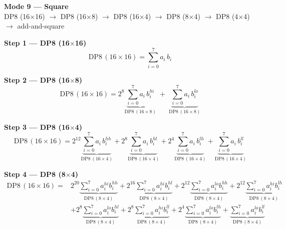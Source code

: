 \documentclass[fleqn]{article}
\newcommand{\DPop}[3]{\mathrm{DP#1}\,(#2\!\times\!#3)}
\begin{document}
\begin{center}
{\LARGE \textbf{Mode 9 --- Square}}\\[4pt]
{\large DP8 (16$\times$16) $\rightarrow$ DP8 (16$\times$8) $\rightarrow$ DP8 (16$\times$4) $\rightarrow$ DP8 (8$\times$4) $\rightarrow$ DP8 (4$\times$4) $\rightarrow$ add-and-square}
\end{center}

\vspace{0.1em}

\textbf{Step 1 --- DP8 (16$\times$16)}
\[
\DPop{8}{16}{16} = \sum_{i=0}^{7} a_i \, b_i
\]

\textbf{Step 2 --- DP8 (16$\times$8)}
\[
\DPop{8}{16}{16}
  = 2^{8} \underbrace{\sum_{i=0}^{7} a_i \, b_i^{hi}}_{\DPop{8}{16}{8}}
  \; + \; \underbrace{\sum_{i=0}^{7} a_i \, b_i^{lo}}_{\DPop{8}{16}{8}}
\]

\textbf{Step 3 --- DP8 (16$\times$4)}
\[
\DPop{8}{16}{16}
  = 2^{12} \underbrace{\sum_{i=0}^{7} a_i \, b_i^{hh}}_{\DPop{8}{16}{4}}
  + 2^{8} \underbrace{\sum_{i=0}^{7} a_i \, b_i^{hl}}_{\DPop{8}{16}{4}}
  + 2^{4} \underbrace{\sum_{i=0}^{7} a_i \, b_i^{lh}}_{\DPop{8}{16}{4}}
  + \underbrace{\sum_{i=0}^{7} a_i \, b_i^{ll}}_{\DPop{8}{16}{4}}
\]

\textbf{Step 4 --- DP8 (8$\times$4)}
\begin{align*}
\DPop{8}{16}{16} = {}
  & 2^{20} \underbrace{\sum_{i=0}^{7} a_i^{hi} b_i^{hh}}_{\DPop{8}{8}{4}}
  + 2^{16} \underbrace{\sum_{i=0}^{7} a_i^{hi} b_i^{hl}}_{\DPop{8}{8}{4}}
  + 2^{12} \underbrace{\sum_{i=0}^{7} a_i^{lo} b_i^{hh}}_{\DPop{8}{8}{4}}
  + 2^{12} \underbrace{\sum_{i=0}^{7} a_i^{hi} b_i^{lh}}_{\DPop{8}{8}{4}} \\[1em]
  & + 2^{8} \underbrace{\sum_{i=0}^{7} a_i^{lo} b_i^{hl}}_{\DPop{8}{8}{4}}
  + 2^{8} \underbrace{\sum_{i=0}^{7} a_i^{hi} b_i^{ll}}_{\DPop{8}{8}{4}}
  + 2^{4} \underbrace{\sum_{i=0}^{7} a_i^{lo} b_i^{lh}}_{\DPop{8}{8}{4}}
  + \underbrace{\sum_{i=0}^{7} a_i^{lo} b_i^{ll}}_{\DPop{8}{8}{4}}
\end{align*}
\end{document}
